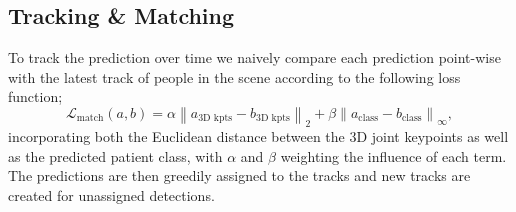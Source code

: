 \documentclass[options]{report}
\newcommand{\norm}[2]{\left \lVert #1 \right \rVert_{#2}}
\begin{document}
\subsection*{Tracking \& Matching}
To track the prediction over time we naively compare each prediction point-wise with the latest track of people in the scene according to the following loss function;
\begin{equation}
    \mathcal{L}_\text{match}(a, b) = \alpha \norm{a_\text{3D kpts} - b_\text{3D kpts}}{2} + \beta \norm{a_\text{class} - b_\text{class}}{\infty},
\end{equation}
incorporating both the Euclidean distance between the 3D joint keypoints as well as the predicted patient class, with $\alpha$ and $\beta$ weighting the influence of each term. The predictions are then greedily assigned to the tracks and new tracks are created for unassigned detections. 
\end{document}
